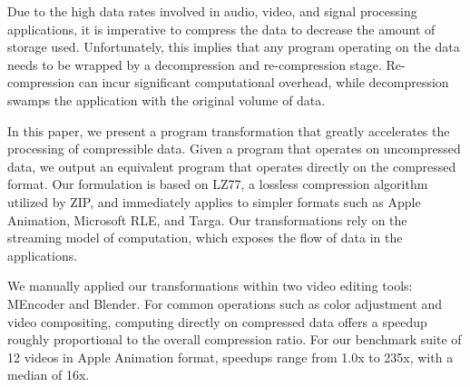 Due to the high data rates involved in audio, video, and signal
processing applications, it is imperative to compress the data to
decrease the amount of storage used.  Unfortunately, this implies that
any program operating on the data needs to be wrapped by a
decompression and re-compression stage.  Re-compression can incur
significant computational overhead, while decompression swamps the
application with the original volume of data.

In this paper, we present a program transformation that greatly
accelerates the processing of compressible data.  Given a program that
operates on uncompressed data, we output an equivalent program that
operates directly on the compressed format.  Our formulation is based
on LZ77, a lossless compression algorithm utilized by ZIP, and
immediately applies to simpler formats such as Apple Animation,
Microsoft RLE, and Targa.  Our transformations rely on the streaming
model of computation, which exposes the flow of data in the
applications.

We manually applied our transformations within two video editing
tools: MEncoder and Blender.  For common operations such as color
adjustment and video compositing, computing directly on compressed
data offers a speedup roughly proportional to the overall compression
ratio.  For our benchmark suite of 12 videos in Apple Animation
format, speedups range from 1.0x to 235x, with a median of 16x.
